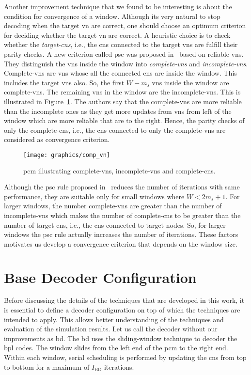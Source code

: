 Another improvement technique that we found to be interesting is about the condition for convergence of a window. Although its very natural to stop decoding when the target \gls{vn} are correct, one should choose an optimum criterion for deciding whether the target \gls{vn} are correct. A heuristic choice is to check whether the \emph{target-\glspl{cn}}, i.e., the \glspl{cn} connected to the target \glspl{vn} are fulfill their parity checks. A new criterion called \gls{psc} was proposed in~\cite{Kang2018} based on reliable \glspl{vn}. They distinguish the \glspl{vn} inside the window into \emph{complete-\glspl{vn}} and \emph{incomplete-\glspl{vn}}. Complete-\glspl{vn} are \glspl{vn} whose all the connected \glspl{cn} are inside the window. This includes the target \glspl{vn} also. So, the first $W-m_s$ \glspl{vn} inside the window are complete-\glspl{vn}. The remaining \glspl{vn} in the window are the incomplete-\glspl{vn}. This is illustrated in Figure~\ref{fig:comp_vn}. The authors say that the complete-\glspl{vn} are more reliable than the incomplete ones as they get more updates from \glspl{vn} from left of the window which are more reliable that are to the right. Hence, the parity checks of only the complete-\glspl{cn}, i.e., the \glspl{cn} connected to only the complete-\glspl{vn} are considered as convergence criterion.
\begin{figure}[htbp]
  \centering
  \texttt{[image: graphics/comp\_vn]}
  \caption{\gls{pcm} illustrating complete-\glspl{vn}, incomplete-\glspl{vn} and complete-\glspl{cn}.}
  \label{fig:comp_vn}
\end{figure}

Although the \gls{psc} rule proposed in~\cite{Kang2018} reduces the number of iterations with same performance, they are suitable only for small windows where $W<2m_s+1$. For larger windows, the number complete-\glspl{vn} are greater than the number of incomplete-\glspl{vn} which makes the number of complete-\glspl{cn} to be greater than the number of target-\glspl{cn}, i.e., the \glspl{cn} connected to target nodes. So, for larger windows the \gls{psc} rule actually increases the number of iterations. These factors motivates us develop a convergence criterion that depends on the window size.

\section{Base Decoder Configuration}
Before discussing the details of the techniques that are developed in this work, it is essential to define a decoder configuration on top of which the techniques are intended to apply. This allows better understanding of the techniques and evaluation of the simulation results. Let us call the decoder without our improvements as \gls{bd}. The \gls{bd} uses the sliding-window technique to decoder the \gls{bpl} codes. The window slides from the left end of the \gls{pcm} to the right end. Within each window, serial scheduling is performed by updating the \glspl{cn} from top to bottom for a maximum of $I_{\text{BD}}$ iterations.

